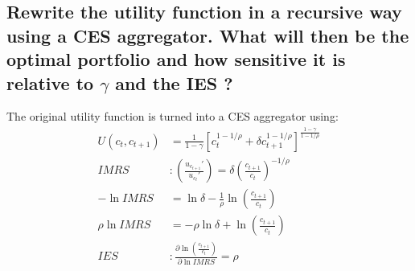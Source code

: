 \documentclass[]{article}
\begin{document}
\subsection{Rewrite the utility function in a recursive way using a CES aggregator. What will then be the optimal portfolio and how sensitive it is relative to $\gamma$ and the IES ?}
The original utility function is turned into a CES aggregator using:
\begin{align*}
	U(c_t, c_{t+1}) &= \frac{1}{1-\gamma} \left[c_t^{1-1/\rho} + \delta c_{t+1}^{1-1/\rho}\right]^{\frac{1-\gamma}{1-1/\rho}}\\
	IMRS &: \left( \frac{u_{c_{t+1}}'}{u_{c_t}'} \right) = \delta \left(\frac{c_{t+1}}{c_t}\right)^{-1/\rho}\\
	-\ln IMRS &= \ln \delta -\frac{1}{\rho} \ln \left(\frac{c_{t+1}}{c_t}\right)\\
	\rho \ln IMRS &= -\rho \ln \delta + \ln \left(\frac{c_{t+1}}{c_t}\right)\\
	IES &: \frac{\partial \ln \left(\frac{c_{t+1}}{c_t}\right)}{\partial \ln IMRS} = \rho\\
\end{align*}
\end{document}
